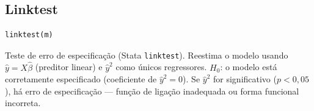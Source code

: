 \subsection{Linktest}

\begin{lstlisting}
linktest(m)
\end{lstlisting}

Teste de erro de especificação (Stata \texttt{linktest}). Reestima o
modelo usando $\hat{y} = X\hat{\beta}$ (preditor linear) e $\hat{y}^2$
como únicos regressores. $H_0$: o modelo está corretamente especificado
(coeficiente de $\hat{y}^2 = 0$). Se $\hat{y}^2$ for significativo
($p < 0{,}05$), há erro de especificação --- função de ligação
inadequada ou forma funcional incorreta.
